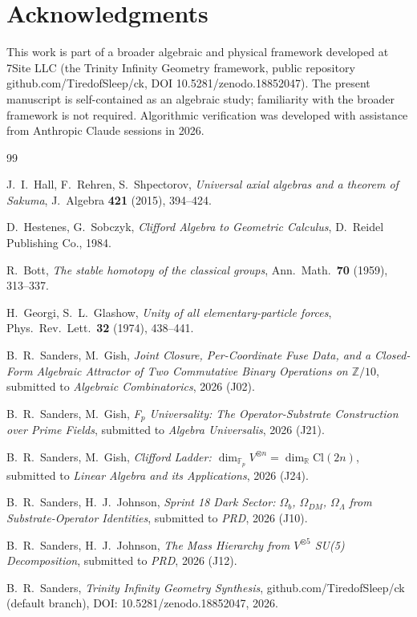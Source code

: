 \documentclass[11pt,reqno]{amsart}
\theoremstyle{plain}
\theoremstyle{definition}
\theoremstyle{remark}
\newcommand{\Z}{\mathbb{Z}}
\newcommand{\F}{\mathbb{F}}
\newcommand{\R}{\mathbb{R}}
\newcommand{\Cl}{\mathrm{Cl}}
\begin{document}
\section*{Acknowledgments}

This work is part of a broader algebraic and physical framework developed
at 7Site LLC (the Trinity Infinity Geometry framework, public repository
github.com/TiredofSleep/ck, DOI 10.5281/zenodo.18852047). The present
manuscript is self-contained as an algebraic study; familiarity with the
broader framework is not required. Algorithmic verification was developed
with assistance from Anthropic Claude sessions in 2026.

\begin{thebibliography}{99}

 J.~I.~Hall, F.~Rehren, S.~Shpectorov,
\emph{Universal axial algebras and a theorem of Sakuma},
J.~Algebra \textbf{421} (2015), 394--424.

 D.~Hestenes, G.~Sobczyk,
\emph{Clifford Algebra to Geometric Calculus},
D.~Reidel Publishing Co., 1984.

 R.~Bott,
\emph{The stable homotopy of the classical groups},
Ann.~Math.~\textbf{70} (1959), 313--337.

 H.~Georgi, S.~L.~Glashow,
\emph{Unity of all elementary-particle forces},
Phys.~Rev.~Lett.~\textbf{32} (1974), 438--441.

 B.~R.~Sanders, M.~Gish,
\emph{Joint Closure, Per-Coordinate Fuse Data, and a Closed-Form
Algebraic Attractor of Two Commutative Binary Operations on
$\Z/10$}, submitted to \emph{Algebraic Combinatorics}, 2026 (J02).

 B.~R.~Sanders, M.~Gish,
\emph{F$_p$ Universality: The Operator-Substrate Construction over
Prime Fields}, submitted to \emph{Algebra Universalis}, 2026 (J21).

 B.~R.~Sanders, M.~Gish,
\emph{Clifford Ladder: $\dim_{\F_p} V^{\otimes n} = \dim_\R \Cl(2n)$},
submitted to \emph{Linear Algebra and its Applications}, 2026 (J24).

 B.~R.~Sanders, H.~J.~Johnson,
\emph{Sprint 18 Dark Sector: $\Omega_b$, $\Omega_{DM}$, $\Omega_\Lambda$
from Substrate-Operator Identities}, submitted to \emph{PRD}, 2026
(J10).

 B.~R.~Sanders, H.~J.~Johnson,
\emph{The Mass Hierarchy from $V^{\otimes 5}$ SU(5) Decomposition},
submitted to \emph{PRD}, 2026 (J12).

 B.~R.~Sanders,
\emph{Trinity Infinity Geometry Synthesis},
github.com/TiredofSleep/ck (default branch),
DOI: 10.5281/zenodo.18852047, 2026.

\end{thebibliography}
\end{document}

